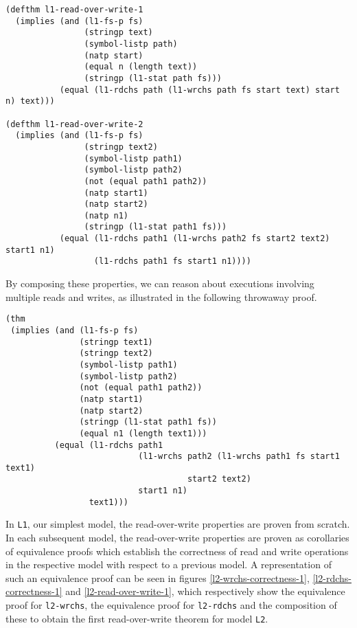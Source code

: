 \documentclass[submission,copyright,creativecommons]{eptcs}
\begin{document}
\medskip

\noindent
\begin{verbatim}
(defthm l1-read-over-write-1
  (implies (and (l1-fs-p fs)
                (stringp text)
                (symbol-listp path)
                (natp start)
                (equal n (length text))
                (stringp (l1-stat path fs)))
           (equal (l1-rdchs path (l1-wrchs path fs start text) start n) text)))

(defthm l1-read-over-write-2
  (implies (and (l1-fs-p fs)
                (stringp text2)
                (symbol-listp path1)
                (symbol-listp path2)
                (not (equal path1 path2))
                (natp start1)
                (natp start2)
                (natp n1)
                (stringp (l1-stat path1 fs)))
           (equal (l1-rdchs path1 (l1-wrchs path2 fs start2 text2) start1 n1)
                  (l1-rdchs path1 fs start1 n1))))
\end{verbatim}

By composing these properties, we can reason about executions
involving multiple reads and writes, as illustrated in the following
throwaway proof.

\medskip

\noindent
\begin{verbatim}
(thm
 (implies (and (l1-fs-p fs)
               (stringp text1)
               (stringp text2)
               (symbol-listp path1)
               (symbol-listp path2)
               (not (equal path1 path2))
               (natp start1)
               (natp start2)
               (stringp (l1-stat path1 fs))
               (equal n1 (length text1)))
          (equal (l1-rdchs path1
                           (l1-wrchs path2 (l1-wrchs path1 fs start1 text1)
                                     start2 text2)
                           start1 n1)
                 text1)))
\end{verbatim}

In \texttt{L1}, our simplest model, the read-over-write properties
are proven from scratch. In each subsequent model, the read-over-write
properties are proven as corollaries of equivalence proofs which
establish the correctness of read and write operations in the
respective model with respect to a previous model. A representation of
such an equivalence proof can be seen in figures
\ref{l2-wrchs-correctness-1}, \ref{l2-rdchs-correctness-1} and
\ref{l2-read-over-write-1}, which respectively show the equivalence
proof for \texttt{l2-wrchs}, the equivalence proof for
\texttt{l2-rdchs} and the composition of these to obtain the first
read-over-write theorem for model \texttt{L2}.
\end{document}
